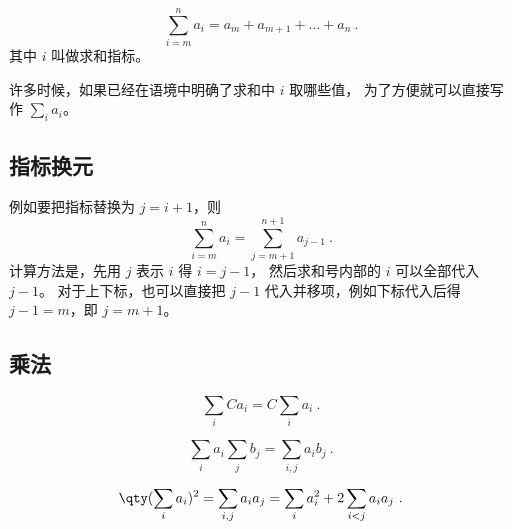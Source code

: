 
\begin{issues}
\issueDraft
\end{issues}

\begin{equation}
\sum_{i=m}^n a_i = a_m + a_{m+1} + \dots + a_n~.
\end{equation}
其中 $i$ 叫做求和指标。

许多时候，如果已经在语境中明确了求和中 $i$ 取哪些值， 为了方便就可以直接写作 $\displaystyle\sum_i a_i$。

\subsection{指标换元}
例如要把指标替换为 $j=i+1$，则
\begin{equation}
\sum_{i=m}^n a_i = \sum_{j=m+1}^{n+1} a_{j-1} ~.
\end{equation}
计算方法是，先用 $j$ 表示 $i$ 得 $i=j-1$， 然后求和号内部的 $i$ 可以全部代入 $j-1$。 对于上下标，也可以直接把 $j-1$ 代入并移项，例如下标代入后得 $j-1=m$，即 $j=m+1$。

\subsection{乘法}
\begin{equation}
\sum_i C a_i = C\sum_i a_i~.
\end{equation}

\begin{equation}
\sum_i a_i \sum_j b_j = \sum_{i,j} a_i b_j~.
\end{equation}

\begin{equation}
\qty(\sum_i a_i)^2 = \sum_{i,j} a_i a_j = \sum_i a_i^2 + 2\sum_{i<j} a_i a_j~.
\end{equation}
